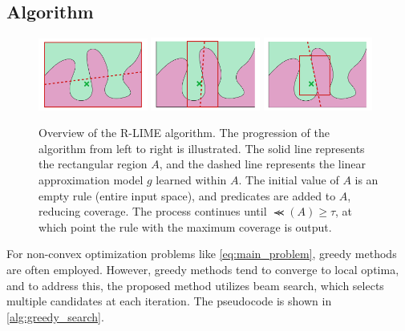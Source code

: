 \documentclass[runningheads]{llncs}
\begin{document}
\subsection{Algorithm}\label{sec:alg}
{%
  \begin{figure}[t]
    \centering
    \includegraphics[width=0.32\textwidth]{rlime1}
    \includegraphics[width=0.32\textwidth]{rlime2}
    \includegraphics[width=0.32\textwidth]{rlime3}
    \caption{%
      Overview of the R-LIME algorithm.
      The progression of the algorithm from left to right is illustrated.
      The solid line represents the rectangular region $A$,
      and the dashed line represents the linear approximation model $g$
      learned within $A$.
      The initial value of $A$ is an empty rule (entire input space),
      and predicates are added to $A$, reducing coverage.
      The process continues until $\Prec(A)\ge\tau$,
      at which point the rule with the maximum coverage is output.
    }
  \end{figure}
  \begin{algorithm}[p]
    
  \end{algorithm}
  \begin{algorithm}[p]
    
  \end{algorithm}
  \def\myidt{\hspace{\algorithmicindent}}
  \begin{algorithm}[p]
    
  \end{algorithm}
  \begin{algorithm}[p]
    
  \end{algorithm}
}
For non-convex optimization problems like \cref{eq:main_problem}, greedy methods are often employed. However, greedy methods tend to converge to local optima, and to address this, the proposed method utilizes beam search, which selects multiple candidates at each iteration. The pseudocode is shown in \cref{alg:greedy_search}.
\end{document}
